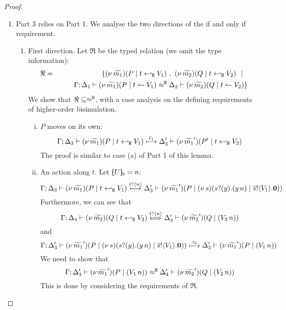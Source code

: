 \begin{proof}
\begin{enumerate}[$-$]
	\item Part 3 relies on Part 1. We analyse the two	directions of the if and only if requirement.
	\begin{enumerate}
		\item First direction. Let $\Re$ be the typed relation (we omit the type information):
				\begin{eqnarray*}
					\Re &=&	\set{	\newsp{\widetilde{m_1}}{P \Par \htrigger{t}{V_1}}\ ,\ 
									\newsp{\widetilde{m_2}}{Q \Par \htrigger{t}{V_2}} \setbar\\
						&&
									\qquad \horel{\Gamma}{\Delta_1}{\newsp{\widetilde{m_1}}{P \Par \ntrigger{t}{V_1}  } }
									{\hwb}
									{\Delta_2}{\newsp{\widetilde{m_2}}{Q \Par \ntrigger{t}{V_2}  } }
					}
				\end{eqnarray*}
				We show that $\Re \subseteq \approx^\mathtt{H}$, with a case analysis on the defining requirements
				of higher-order bisimulation.
				\begin{enumerate}[i)]
					\item $P$ moves on its own:
							\[
								\Gamma; \Delta_3 \vdash (\nu\, \widetilde{m_1})(P \;|\; t \hookleftarrow_{\mathtt{H}} V_1  )  \stackrel{\ell_1}{\longmapsto} \Delta_3' \vdash (\nu\, \widetilde{m_1}')(P' \;|\; t \hookleftarrow_{\mathtt{H}} V_2  )
							\]
							The proof is similar to case (a) of Part 1 of this lemma.
					\item	An action along $t$. Let $[\!\!(U)\!\!]_{\mathsf{c}} = n$:
							\[
								\Gamma; \Delta_3 \vdash (\nu\, \widetilde{m_1})(P \;|\; t \hookleftarrow_{\mathtt{H}} V_1  )  \stackrel{t ? \langle n \rangle}{\longmapsto} \Delta_3' \vdash (\nu\, \widetilde{m_1}')(P \;|\; (\nu\, s)(s ? (y) . (y\, {n}) \;|\; \overline{s} ! \langle V_1 \rangle . \mathbf{0}))
							\]
							Furthermore, we can see that
							\[
								\horel{\Gamma}{\Delta_4}{\newsp{\widetilde{m_2}}{Q \Par \htrigger{t}{V_2}  } }
								{\Hby{\bactinp{t}{n}}}
								{\Delta_4'}{\newsp{\widetilde{m_2}'}{Q \Par (\appl{V_2}{n})}}
							\]
							 and
							\[
								\Gamma; \Delta_3' \vdash (\nu\, \widetilde{m_1}')(P \;|\; (\nu\, s)(s ? (y) .{(y\, {n})} \;|\; \overline{s} ! \langle V_1 \rangle . \mathbf{0})) \stackrel{\tau_{\mathsf{d}}}{\longmapsto} \Delta_3' \vdash (\nu\, \widetilde{m_1}')(P \;|\; (V_1\, {n}))
							\]
							We need to show that
							\[
								\Gamma; \Delta_3' \vdash (\nu\, \widetilde{m_1}')(P \;|\; (V_1\, {n})) \approx^\mathtt{H} \Delta_4' \vdash (\nu\, \widetilde{m_2}')(Q \;|\; (V_2\, {n}))
							\]
							This is done by considering the requirements of $\Re$. \\

\end{enumerate}
\end{enumerate}
\end{enumerate}
\end{proof}
